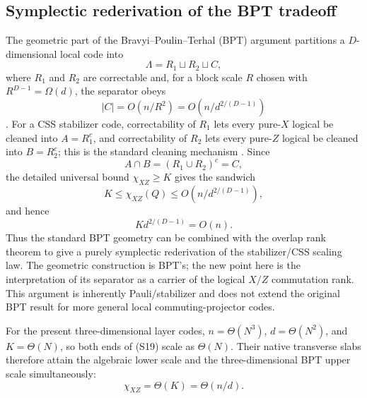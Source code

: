 \documentclass[aps,prx,reprint,superscriptaddress,nofootinbib,floatfix,longbibliography]{revtex4-2}
\theoremstyle{definition}
\begin{document}
\subsection{Symplectic rederivation of the BPT tradeoff}
The geometric part of the Bravyi--Poulin--Terhal (BPT) argument partitions a
$D$-dimensional local code into
\begin{equation}
 \Lambda=R_1\sqcup R_2\sqcup C, \tag{S16}
\end{equation}
where $R_1$ and $R_2$ are correctable and, for a block scale $R$ chosen with
$R^{D-1}=\Omega(d)$, the separator obeys
\begin{equation}
 |C|=O(n/R^2)=O\!\left(n/d^{2/(D-1)}\right)
 \tag{S17}
\end{equation}
\cite{BPT}.  For a CSS stabilizer code, correctability of $R_1$ lets every
pure-$X$ logical be cleaned into $A=R_1^c$, and correctability of $R_2$ lets
every pure-$Z$ logical be cleaned into $B=R_2^c$; this is the standard cleaning
mechanism \cite{HaahPreskillTradeoff}.  Since
\begin{equation}
 A\cap B=(R_1\cup R_2)^c=C, \tag{S18}
\end{equation}
the detailed universal bound $\chi_{XZ}\ge K$ gives the sandwich
\begin{equation}
 K\le\chi_{XZ}(Q)\le O\!\left(n/d^{2/(D-1)}\right), \tag{S19}
\end{equation}
and hence
\begin{equation}
 Kd^{2/(D-1)}=O(n). \tag{S20}
\end{equation}
Thus the standard BPT geometry can be combined with the overlap rank theorem
to give a purely symplectic rederivation of the stabilizer/CSS scaling law.
The geometric construction is BPT's; the new point here is the interpretation
of its separator as a carrier of the logical $X/Z$ commutation rank.  This
argument is inherently Pauli/stabilizer and does not extend the original BPT
result for more general local commuting-projector codes.

For the present three-dimensional layer codes,
$n=\Theta(N^3)$, $d=\Theta(N^2)$, and $K=\Theta(N)$, so both ends of (S19)
scale as $\Theta(N)$.  Their native transverse slabs therefore attain the
algebraic lower scale and the three-dimensional BPT upper scale
simultaneously:
\begin{equation}
 \chi_{XZ}=\Theta(K)=\Theta(n/d). \tag{S21}
\end{equation}
\end{document}
